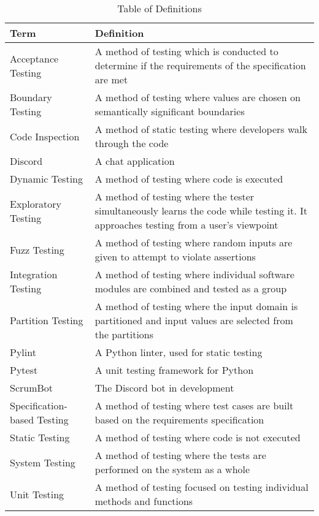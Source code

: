 \documentclass[12pt, titlepage]{article}
\begin{document}
\begin{table}[!htbp]
    \caption{Table of Definitions}
    \label{Table}
    \begin{tabularx}{\textwidth}{p{4cm}X}
        \toprule
        \textbf{Term} & \textbf{Definition}\\
        \midrule
        Acceptance Testing & A method of testing which is conducted to determine if the requirements of the specification are met\\
        Boundary Testing & A method of testing where values are chosen on semantically significant boundaries\\
        Code Inspection & A method of static testing where developers walk through the code\\
        Discord & A chat application\\
        Dynamic Testing & A method of testing where code is executed\\
        Exploratory Testing & A method of testing where the tester simultaneously learns the code while testing it. It approaches testing from a user's viewpoint\\
        Fuzz Testing & A method of testing where random inputs are given to attempt to violate assertions\\
        Integration Testing & A method of testing where individual software modules are combined and tested as a group\\
        Partition Testing & A method of testing where the input domain is partitioned and input values are selected from the partitions\\
        Pylint & A Python linter, used for static testing\\
        Pytest & A unit testing framework for Python\\
        ScrumBot & The Discord bot in development\\
        Specification-based Testing & A method of testing where test cases are built based on the requirements specification\\
        Static Testing & A method of testing where code is not executed\\
        System Testing & A method of testing where the tests are performed on the system as a whole\\
        Unit Testing & A method of testing focused on testing individual methods and functions\\
        \bottomrule
    \end{tabularx}
\end{table}	
\end{document}
